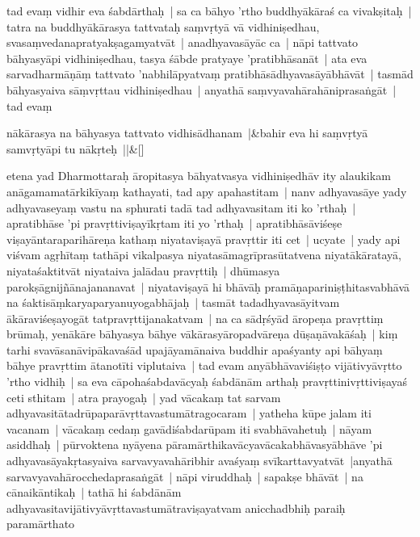 \documentclass[article,12pt,a4paper]{memoir}%
\newcommand{\persName}[1]{#1}
\newcounter{parCount}
\begin{document}
	  
	  \pstart \leavevmode%
	\label{thakur75-65.15} tad evaṃ vidhir eva śabdārthaḥ | sa ca bāhyo 'rtho buddhyākāraś ca vivakṣitaḥ | tatra na buddhyākārasya tattvataḥ saṃvṛtyā vā vidhiniṣedhau, svasaṃvedanapratyakṣagamyatvāt | anadhyavasāyāc ca | nāpi tattvato bāhyasyāpi vidhiniṣedhau, tasya śābde pratyaye 'pratibhāsanāt | ata eva sarvadharmāṇāṃ tattvato 'nabhilāpyatvaṃ pratibhāsādhyavasāyābhāvāt | tasmād bāhyasyaiva sāṃvṛttau vidhiniṣedhau | anyathā saṃvyavahārahāniprasaṅgāt | tad evaṃ
	{}
	\pend%
      
	    
	    \stanza[\smallbreak]
	  \label{thakur75-65.21}nākārasya na bāhyasya tattvato vidhisādhanam |&bahir eva hi saṃvṛtyā samvṛtyāpi tu nākṛteḥ ||\&[\smallbreak]
	  
	  
	  

	  
	  \pstart \leavevmode%
	\label{thakur75-65.24}etena yad \persName{Dharmottaraḥ} āropitasya bāhyatvasya vidhiniṣedhāv ity alaukikam anāgamamatārkikīyaṃ kathayati, tad apy apahastitam | \label{thakur75-65.26} nanv adhyavasāye yady adhyavaseyaṃ vastu na sphurati tadā tad adhyavasitam iti ko 'rthaḥ | apratibhāse 'pi pravṛttiviṣayīkṛtam iti yo 'rthaḥ | apratibhāsāviśeṣe viṣayāntaraparihāreṇa kathaṃ niyataviṣayā pravṛttir iti cet | ucyate | yady api viśvam agṛhītaṃ tathāpi vikalpasya niyatasāmagrīprasūtatvena niyatākāratayā, niyataśaktitvāt niyataiva jalādau pravṛttiḥ | dhūmasya parokṣāgnijñānajananavat | \label{thakur75-66.1} niyataviṣayā hi bhāvāḥ pramāṇapariniṣṭhitasvabhāvā na śaktisāṃkaryaparyanuyogabhājaḥ | tasmāt tadadhyavasāyitvam ākāraviśeṣayogāt tatpravṛttijanakatvam | na ca sādṛśyād āropeṇa pravṛttiṃ brūmaḥ, yenākāre bāhyasya bāhye vākārasyāropadvāreṇa dūṣaṇāvakāśaḥ | kiṃ tarhi svavāsanāvipākavaśād upajāyamānaiva buddhir apaśyanty api bāhyaṃ bāhye pravṛttim ātanotīti viplutaiva | tad evam anyābhāvaviśiṣṭo vijātivyāvṛtto 'rtho vidhiḥ | sa eva cāpohaśabdavācyaḥ śabdānām arthaḥ pravṛttinivṛttiviṣayaś ceti sthitam | \label{thakur75-66.8} atra prayogaḥ | yad vācakaṃ tat sarvam adhyavasitātadrūpaparāvṛttavastumātragocaram | yatheha kūpe jalam iti vacanam | vācakaṃ cedaṃ gavādiśabdarūpam iti svabhāvahetuḥ | nāyam asiddhaḥ | pūrvoktena nyāyena pāramārthikavācyavācakabhāvasyābhāve 'pi adhyavasāyakṛtasyaiva sarvavyavahāribhir avaśyaṃ svīkarttavyatvāt |anyathā sarvavyavahārocchedaprasaṅgāt | nāpi viruddhaḥ | sapakṣe bhāvāt | na cānaikāntikaḥ | tathā hi śabdānām adhyavasitavijātivyāvṛttavastumātraviṣayatvam anicchadbhiḥ paraiḥ paramārthato
	{}
	\pend%
      
\end{document}
